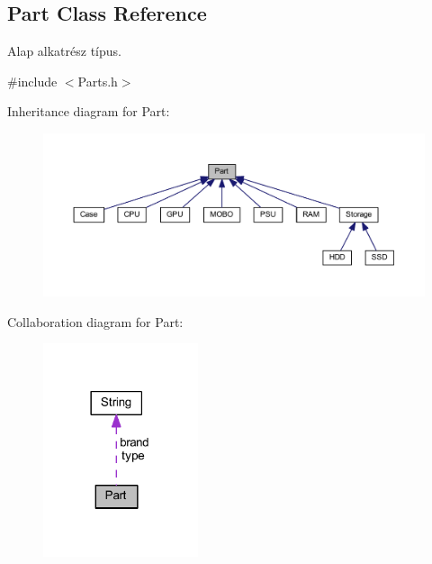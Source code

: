 \hypertarget{class_part}{}\subsection{Part Class Reference}
\label{class_part}


Alap alkatrész típus.  




{\ttfamily \#include $<$Parts.\+h$>$}



Inheritance diagram for Part\+:
\nopagebreak
\begin{figure}[H]
\begin{center}
\leavevmode
\includegraphics[width=350pt]{class_part__inherit__graph}
\end{center}
\end{figure}


Collaboration diagram for Part\+:
\nopagebreak
\begin{figure}[H]
\begin{center}
\leavevmode
\includegraphics[width=129pt]{class_part__coll__graph}
\end{center}
\end{figure}
